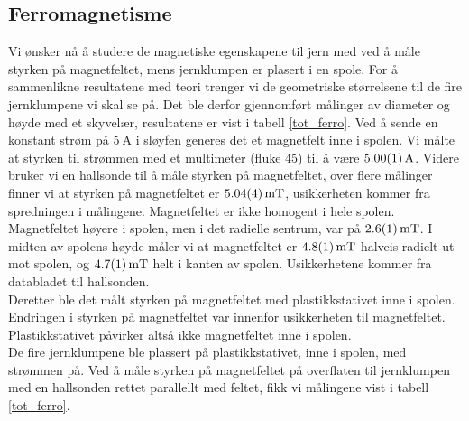 \documentclass[%
 reprint,
 amsmath,amssymb,
 aps,
]{revtex4-1}
\begin{document}
\subsection{Ferromagnetisme}
Vi ønsker nå å studere de magnetiske egenskapene til jern med ved å måle styrken på magnetfeltet, mens jernklumpen er plasert i en spole. For å sammenlikne resultatene med teori trenger vi de geometriske størrelsene til de fire jernklumpene vi skal se på. Det ble derfor gjennomført målinger av diameter og høyde med et skyvelær, resultatene er vist  i tabell \vref{tot_ferro}.
Ved å sende en konstant strøm på $\SI{5}{\ampere}$ i sløyfen generes det et magnetfelt inne i spolen. Vi målte at styrken til strømmen med et multimeter (fluke 45) til å være $\SI{5.00\pm0.01}{\ampere}$. Videre bruker vi en hallsonde til å måle styrken på magnetfeltet, over flere målinger finner vi at styrken på magnetfeltet er $\SI{5.04\pm0.04}{\milli\tesla}$, usikkerheten kommer fra spredningen i målingene. Magnetfeltet er ikke homogent i hele spolen. Magnetfeltet høyere i spolen, men i det radielle sentrum, var på $\SI{2.6\pm0.1}{\milli\tesla}$. I midten av spolens høyde måler vi at magnetfeltet er $\SI{4.8\pm0.1}{\milli\tesla}$ halveis radielt ut mot spolen, og $\SI{4.7\pm0.1}{\milli\tesla}$ helt i kanten av spolen. Usikkerhetene kommer fra databladet til hallsonden.\\
Deretter ble det målt styrken på magnetfeltet med plastikkstativet inne i spolen. Endringen i styrken på magnetfeltet var innenfor usikkerheten til magnetfeltet. Plastikkstativet påvirker altså ikke magnetfeltet inne i spolen. \\
De fire jernklumpene ble plassert på plastikkstativet, inne i spolen, med strømmen på. Ved å måle styrken på magnetfeltet på overflaten til jernklumpen med en hallsonden rettet parallellt med feltet, fikk vi målingene vist i tabell \vref{tot_ferro}.\par
\end{document}
